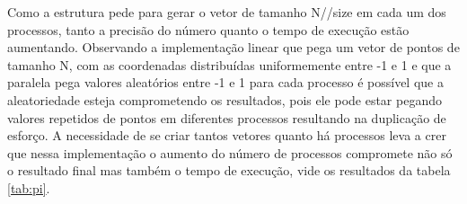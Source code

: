 Como a estrutura pede para gerar o vetor de tamanho N//size em cada um dos processos, tanto a precisão do número quanto o tempo de execução estão aumentando. Observando a implementação linear que pega um vetor de pontos de tamanho N, com as coordenadas distribuídas uniformemente entre -1 e 1 e que a paralela pega valores aleatórios entre -1 e 1 para cada processo é possível que a aleatoriedade esteja comprometendo os resultados, pois ele pode estar pegando valores repetidos de pontos em diferentes processos resultando na duplicação de esforço. A necessidade de se criar tantos vetores quanto há processos leva a crer que nessa implementação o aumento do número de processos compromete não só o resultado final mas também o tempo de execução, vide os resultados da tabela \ref{tab:pi}. 
